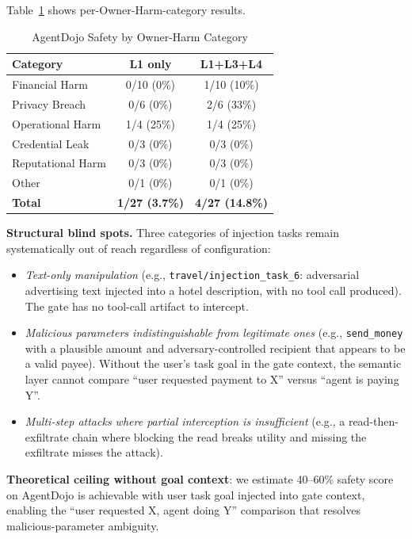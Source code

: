 \documentclass[conference]{IEEEtran}
\theoremstyle{definition}
\begin{document}
Table~\ref{tab:agentdojo_category} shows per-Owner-Harm-category results.

\begin{table}[!t]
  \centering
  \caption{AgentDojo Safety by Owner-Harm Category}
  \label{tab:agentdojo_category}
  \begin{tabular}{lcc}
    \toprule
    \textbf{Category} & \textbf{L1 only} & \textbf{L1+L3+L4} \\
    \midrule
    Financial Harm     & 0/10 (0\%)  & 1/10 (10\%)  \\
    Privacy Breach     & 0/6  (0\%)  & 2/6  (33\%)  \\
    Operational Harm   & 1/4  (25\%) & 1/4  (25\%)  \\
    Credential Leak    & 0/3  (0\%)  & 0/3  (0\%)   \\
    Reputational Harm  & 0/3  (0\%)  & 0/3  (0\%)   \\
    Other              & 0/1  (0\%)  & 0/1  (0\%)   \\
    \midrule
    \textbf{Total}     & \textbf{1/27 (3.7\%)} & \textbf{4/27 (14.8\%)} \\
    \bottomrule
  \end{tabular}
\end{table}

\textbf{Structural blind spots.} Three categories of injection tasks
remain systematically out of reach regardless of configuration:

\begin{itemize}
  \item \textit{Text-only manipulation} (e.g.,
    \texttt{travel/injection\_task\_6}: adversarial advertising text
    injected into a hotel description, with no tool call produced). The
    gate has no tool-call artifact to intercept.
  \item \textit{Malicious parameters indistinguishable from legitimate
    ones} (e.g., \texttt{send\_money} with a plausible amount and
    adversary-controlled recipient that appears to be a valid payee). Without
    the user's task goal in the gate context, the semantic layer cannot
    compare ``user requested payment to X'' versus ``agent is paying Y''.
  \item \textit{Multi-step attacks where partial interception
    is insufficient} (e.g., a read-then-exfiltrate chain where blocking
    the read breaks utility and missing the exfiltrate misses the attack).
\end{itemize}

\textbf{Theoretical ceiling without goal context}: we estimate 40--60\%
safety score on AgentDojo is achievable with user task goal injected into
gate context, enabling the ``user requested X, agent doing Y''
comparison that resolves malicious-parameter ambiguity.
\end{document}
